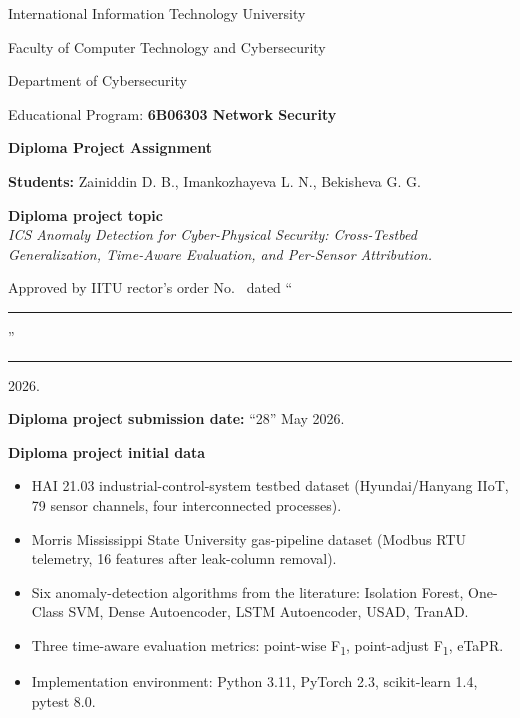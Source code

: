 \thispagestyle{empty}

\begin{center}
{\fontsize{14pt}{18pt}\selectfont International Information Technology University\par}
{\fontsize{14pt}{18pt}\selectfont Faculty of Computer Technology and Cybersecurity\par}
{\fontsize{14pt}{18pt}\selectfont Department of Cybersecurity\par}
\end{center}

\vspace{0.6cm}

\noindent Educational Program: \textbf{6B06303 Network Security}

\vspace{0.4cm}

\begin{center}
{\fontsize{14pt}{18pt}\selectfont \textbf{Diploma Project Assignment}\par}
\end{center}

\vspace{0.3cm}

\noindent\textbf{Students:} Zainiddin D. B., Imankozhayeva L. N., Bekisheva G. G.

\vspace{0.3cm}

\noindent\textbf{Diploma project topic}\\
\textit{ICS Anomaly Detection for Cyber-Physical Security: Cross-Testbed Generalization, Time-Aware Evaluation, and Per-Sensor Attribution.}

\vspace{0.3cm}

\noindent Approved by IITU rector's order No.~ dated ``\rule{1cm}{0.4pt}'' \rule{2cm}{0.4pt} 2026.

\vspace{0.3cm}

\noindent\textbf{Diploma project submission date:} ``28'' May 2026.

\vspace{0.4cm}

\noindent\textbf{Diploma project initial data}
\begin{itemize}
  \setlength\itemsep{0.1em}
  \item HAI 21.03 industrial-control-system testbed dataset (Hyundai/Hanyang IIoT, 79 sensor channels, four interconnected processes).
  \item Morris Mississippi State University gas-pipeline dataset (Modbus RTU telemetry, 16 features after leak-column removal).
  \item Six anomaly-detection algorithms from the literature: Isolation Forest, One-Class SVM, Dense Autoencoder, LSTM Autoencoder, USAD, TranAD.
  \item Three time-aware evaluation metrics: point-wise F\textsubscript{1}, point-adjust F\textsubscript{1}, eTaPR.
  \item Implementation environment: Python 3.11, PyTorch 2.3, scikit-learn 1.4, pytest 8.0.
\end{itemize}

